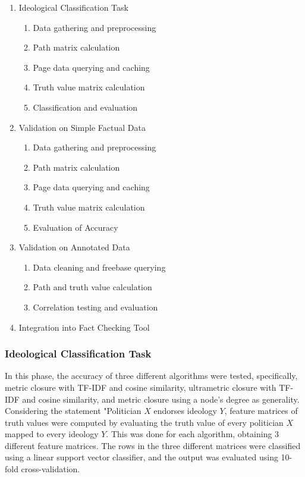 \documentclass[10pt,11pt,12pt,oneside]{book}
\begin{document}
\begin{enumerate}[label*=\arabic*.]
	
	\item {Ideological Classification Task} 
	\begin{enumerate}[label*=\arabic*.]
		\item Data gathering and preprocessing
		\item Path matrix calculation
		\item Page data querying and caching
		\item Truth value matrix calculation
		\item Classification and evaluation
	\end{enumerate}

	\item {Validation on Simple Factual Data}
	\begin{enumerate}[label*=\arabic*.]
		\item Data gathering and preprocessing
		\item Path matrix calculation
		\item Page data querying and caching
		\item Truth value matrix calculation
		\item Evaluation of Accuracy
	\end{enumerate}

	\item {Validation on Annotated Data}
	\begin{enumerate}[label*=\arabic*.]
		\item Data cleaning and freebase querying
		\item Path and truth value calculation
		\item Correlation testing and evaluation
	\end{enumerate}

	\item {Integration into Fact Checking Tool}
\end{enumerate}

\subsubsection{Ideological Classification Task} 

In this phase, the accuracy of three different algorithms were tested, specifically, metric closure with TF-IDF and cosine similarity, ultrametric closure with TF-IDF and cosine similarity, and metric closure using a node's degree as generality. Considering the statement "Politician $ X $ endorses ideology $ Y $, feature matrices of truth values were computed by evaluating the truth value of every politician $ X $ mapped to every ideology $ Y $. This was done for each algorithm, obtaining 3 different feature matrices. The rows in the three different matrices were classified using a linear support vector classifier, and the output was evaluated using 10-fold cross-validation.\\
\end{document}
